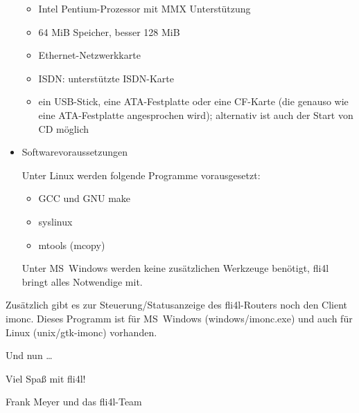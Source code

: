 \begin{itemize}
\begin{itemize}
\item Intel Pentium-Prozessor mit MMX Unterstützung
\item 64 MiB Speicher, besser 128 MiB
\item Ethernet-Netzwerkkarte
\item ISDN: unterstützte ISDN-Karte
\item ein USB-Stick, eine ATA-Festplatte oder eine CF-Karte (die genauso wie
      eine ATA-Festplatte angesprochen wird); alternativ ist auch der Start von
      CD möglich
\end{itemize}

\item Softwarevoraussetzungen

Unter Linux werden folgende Programme vorausgesetzt:

\begin{itemize}
\item GCC und GNU make
\item syslinux
\item mtools (mcopy)
\end{itemize}

Unter MS~Windows werden keine zusätzlichen Werkzeuge benötigt, fli4l bringt
alles Notwendige mit.

\end{itemize}

Zusätzlich gibt es zur Steuerung/Statusanzeige des fli4l-Routers noch
den Client imonc. Dieses Programm ist für MS~Windows (windows/imonc.exe)
und auch für Linux (unix/gtk-imonc) vorhanden.

Und nun \ldots \bigskip

Viel Spaß mit fli4l!\bigskip

Frank Meyer und das fli4l-Team 

